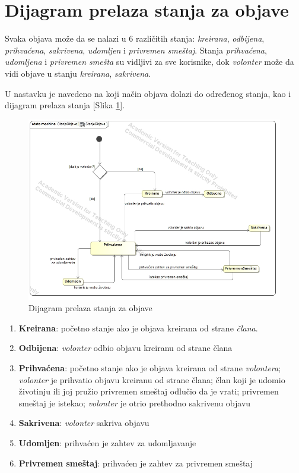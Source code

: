 \section{Dijagram prelaza stanja za objave}
\par Svaka objava može da se nalazi u 6 različitih stanja: \textit{kreirana}, \textit{odbijena},
\textit{prihvaćena}, \textit{sakrivena}, \textit{udomljen} i \textit{privremen smeštaj}. 
Stanja \textit{prihvaćena}, \textit{udomljena} i \textit{privremen smešta} su vidljivi za sve korisnike,
dok \textit{volonter} može da vidi objave u stanju \textit{kreirana}, \textit{sakrivena}.
\par U nastavku je navedeno na koji način objava dolazi do određenog stanja, kao i dijagram prelaza stanja [Slika \ref{fig:state}].
\begin{figure}[h]
    \centering
    \includegraphics[width=\textwidth]{img/state.jpg}
    \caption{Dijagram prelaza stanja za objave}
    \label{fig:state}
\end{figure}
\begin{enumerate}
    \item \textbf{Kreirana}: početno stanje ako je objava kreirana od strane \textit{člana}.
    \item \textbf{Odbijena}: \textit{volonter} odbio objavu kreiranu od strane člana
    \item \textbf{Prihvaćena}: 
        početno stanje ako je objava kreirana od strane \textit{volontera}; 
        \textit{volonter} je prihvatio objavu kreiranu od strane člana;
        član koji je udomio životinju ili joj pružio privremen smeštaj odlučio da je vrati;
        privremen smeštaj je istekao;
        \textit{volonter} je otrio prethodno sakrivenu objavu
    \item \textbf{Sakrivena}: \textit{volonter} sakriva objavu
    \item \textbf{Udomljen}: prihvaćen je zahtev za udomljavanje
    \item \textbf{Privremen smeštaj}: prihvaćen je zahtev za privremen smeštaj
\end{enumerate}
